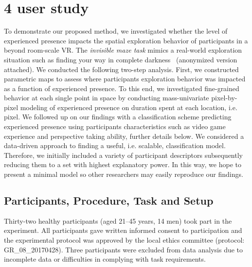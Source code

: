 \section{4 user study}
To demonstrate our proposed method, we investigated whether the level of experienced presence impacts the spatial exploration behavior of participants in a beyond room-scale VR. The \textit{invisible maze task} mimics a real-world exploration situation such as finding your way in complete darkness~\cite{Gehrke2018} (anonymized version attached). We conducted the following two-step analysis. First, we constructed parametric maps to assess where participants exploration behavior was impacted as a function of experienced presence. To this end, we investigated fine-grained behavior at each single point in space by conducting mass-univariate pixel-by-pixel modeling of experienced presence on duration spent at each location, i.e. pixel. We followed up on our findings with a classification scheme predicting experienced presence using participants characteristics such as video game experience and perspective taking ability, further details below. We considered a data-driven approach to finding a useful, i.e. scalable, classification model. Therefore, we initially included a variety of participant descriptors subsequently reducing them to a set with highest explanatory power. In this way, we hope to present a minimal model so other researchers may easily reproduce our findings. 

\subsection{Participants, Procedure, Task and Setup} Thirty-two healthy participants (aged 21--45 years, 14 men) took part in the experiment. All participants gave written informed consent to participation and the experimental protocol was approved by the local ethics committee (protocol: GR\_08\_20170428). Three participants were excluded from data analysis due to incomplete data or difficulties in complying with task requirements.

